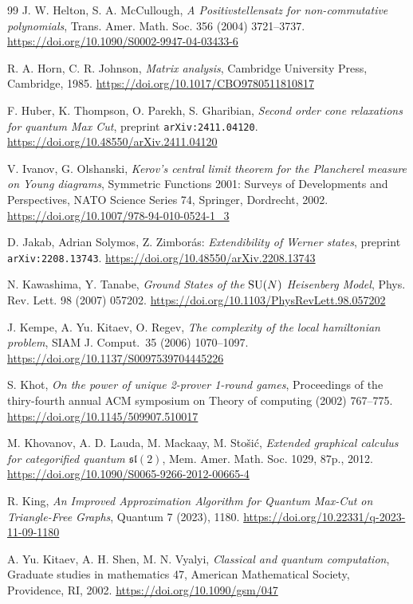 \documentclass[12pt,dvipsnames,accepted=2016-08-18,a4paper,onecolumn]{quantumarticle}
\numberwithin{equation}{section}
\theoremstyle{definition}
\begin{document}
\begin{thebibliography}{99}
J. W. Helton, S. A. McCullough,
\textit{A Positivstellensatz for non-commutative polynomials},
Trans. Amer. Math. Soc. 356 (2004) 3721--3737.
\url{https://doi.org/10.1090/S0002-9947-04-03433-6}

R. A. Horn, C. R. Johnson, 
\textit{Matrix analysis},
Cambridge University Press, Cambridge, 1985.
\url{https://doi.org/10.1017/CBO9780511810817}

F. Huber, K. Thompson, O. Parekh, S. Gharibian, \textit{Second order cone relaxations for quantum Max Cut},  
preprint \texttt{arXiv:2411.04120}. \url{https://doi.org/10.48550/arXiv.2411.04120}

V. Ivanov, G. Olshanski, 
\textit{Kerov’s central limit theorem for the Plancherel measure on Young diagrams}, 
Symmetric Functions 2001: Surveys of Developments and Perspectives, NATO Science Series 74, Springer, Dordrecht, 2002. \url{https://doi.org/10.1007/978-94-010-0524-1_3}

D. Jakab, Adrian Solymos, Z. Zimbor{\'a}s: 
\textit{Extendibility of Werner states}, preprint \texttt{arXiv:2208.13743}.
\url{https://doi.org/10.48550/arXiv.2208.13743}

N. Kawashima, Y. Tanabe, 
\textit{Ground States of the ${\rm SU}(N)$ Heisenberg
Model}, 
Phys. Rev. Lett. 98 (2007) 057202.
\url{https://doi.org/10.1103/PhysRevLett.98.057202}

  J. Kempe, A. Yu. Kitaev, O. Regev, \textit{The complexity of the
 local hamiltonian problem},
 SIAM J. Comput.~35 (2006) 1070--1097.
 \url{https://doi.org/10.1137/S0097539704445226}

S. Khot, \textit{On the power of unique 2-prover 1-round games}, Proceedings of
 the thiry-fourth annual ACM symposium on Theory of computing (2002) 767--775.
 \url{https://doi.org/10.1145/509907.510017}

M. Khovanov, A. D. Lauda, M. Mackaay, M. Stošić, \emph{Extended graphical calculus for categorified quantum $\mathfrak{sl}(2)$}, Mem. Amer. Math. Soc. 1029, 87p., 2012.
\url{https://doi.org/10.1090/S0065-9266-2012-00665-4}


 R. King,
 \textit{An Improved Approximation Algorithm for Quantum
 Max-Cut on Triangle-Free Graphs}, Quantum 7 (2023), 1180.
 \url{https://doi.org/10.22331/q-2023-11-09-1180}

 A. Yu. Kitaev, A. H. Shen, M. N. Vyalyi, \textit{Classical and
 quantum computation}, Graduate studies in mathematics 47, American
 Mathematical Society, Providence, RI, 2002. 
 \url{https://doi.org/10.1090/gsm/047}


\end{thebibliography}
\end{document}
